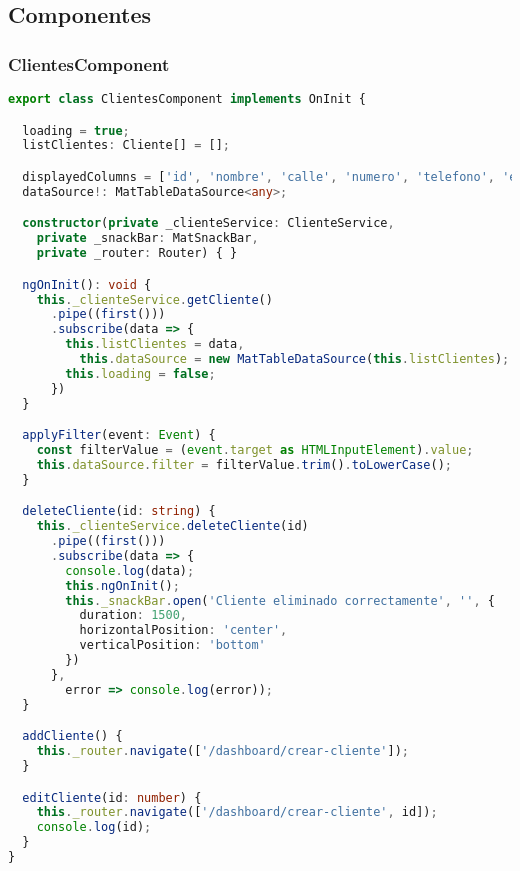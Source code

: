 \documentclass[a4paper]{article} %
\begin{document}
\subsection{Componentes}
\subsubsection{ClientesComponent}
\begin{lstlisting}[language=Typescript]
	export class ClientesComponent implements OnInit {

  loading = true;
  listClientes: Cliente[] = [];

  displayedColumns = ['id', 'nombre', 'calle', 'numero', 'telefono', 'email', 'socio', 'acciones'];
  dataSource!: MatTableDataSource<any>;

  constructor(private _clienteService: ClienteService,
    private _snackBar: MatSnackBar,
    private _router: Router) { }

  ngOnInit(): void {
    this._clienteService.getCliente()
      .pipe((first()))
      .subscribe(data => {
        this.listClientes = data,
          this.dataSource = new MatTableDataSource(this.listClientes);
        this.loading = false;
      })
  }

  applyFilter(event: Event) {
    const filterValue = (event.target as HTMLInputElement).value;
    this.dataSource.filter = filterValue.trim().toLowerCase();
  }

  deleteCliente(id: string) {
    this._clienteService.deleteCliente(id)
      .pipe((first()))
      .subscribe(data => {
        console.log(data);
        this.ngOnInit();
        this._snackBar.open('Cliente eliminado correctamente', '', {
          duration: 1500,
          horizontalPosition: 'center',
          verticalPosition: 'bottom'
        })
      },
        error => console.log(error));
  }

  addCliente() {
    this._router.navigate(['/dashboard/crear-cliente']);
  }

  editCliente(id: number) {
    this._router.navigate(['/dashboard/crear-cliente', id]);
    console.log(id);
  }
}
\end{lstlisting}\clearpage
\end{document}
